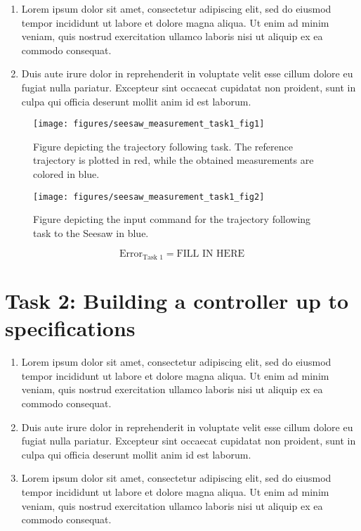 \documentclass[12pt,a4paper,twocolumn]{article}
\begin{document}
\begin{enumerate}[label=\alph*)]
\item Lorem ipsum dolor sit amet, consectetur adipiscing elit, sed do eiusmod tempor incididunt ut labore et dolore magna aliqua. Ut enim ad minim veniam, quis nostrud exercitation ullamco laboris nisi ut aliquip ex ea commodo consequat. 

\item Duis aute irure dolor in reprehenderit in voluptate velit esse cillum dolore eu fugiat nulla pariatur. Excepteur sint occaecat cupidatat non proident, sunt in culpa qui officia deserunt mollit anim id est laborum.
\end{enumerate}

\begin{figure}[ht]
\centering
\texttt{[image: figures/seesaw\_measurement\_task1\_fig1]}
\caption[Measure1]{\label{f:measure1} Figure depicting the trajectory following task. The reference trajectory is plotted in red, while the obtained measurements are colored in blue.}
\label{fig:seesaw_task1_fig1}
\end{figure}

\begin{figure}[ht]
\centering
\texttt{[image: figures/seesaw\_measurement\_task1\_fig2]}
\caption[Measure1]{\label{f:measure1} Figure depicting the input command for the trajectory following task to the Seesaw in blue.}
\label{fig:seesaw_task1_fig2}
\end{figure}


\begin{equation*}
\text{Error}_{\text{Task 1}} = \text{FILL IN HERE}
\end{equation*}



\section*{Task 2: Building a controller up to specifications}
\label{s:task_2}

\begin{enumerate}[label=\alph*)]
\item Lorem ipsum dolor sit amet, consectetur adipiscing elit, sed do eiusmod tempor incididunt ut labore et dolore magna aliqua. Ut enim ad minim veniam, quis nostrud exercitation ullamco laboris nisi ut aliquip ex ea commodo consequat. 

\item Duis aute irure dolor in reprehenderit in voluptate velit esse cillum dolore eu fugiat nulla pariatur. Excepteur sint occaecat cupidatat non proident, sunt in culpa qui officia deserunt mollit anim id est laborum.

\item Lorem ipsum dolor sit amet, consectetur adipiscing elit, sed do eiusmod tempor incididunt ut labore et dolore magna aliqua. Ut enim ad minim veniam, quis nostrud exercitation ullamco laboris nisi ut aliquip ex ea commodo consequat. 
\end{enumerate}
\end{document}
